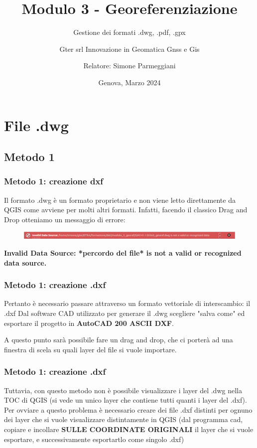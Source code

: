 \documentclass{beamer}
\title{Modulo 3 - Georeferenziazione}
\subtitle{Gestione dei formati .dwg, .pdf, .gpx}
\author[]{Gter srl Innovazione in Geomatica Gnss e Gis}
\author[]{Relatore: Simone Parmeggiani}
\date{Genova, Marzo 2024}
\begin{document}
	{
		{
			\begin{frame}
				\titlepage
			\end{frame}
		}
		\addtocounter{framenumber}{-1}

\section{File .dwg}
\subsection{Metodo 1}

\begin{frame}
   \frametitle{Metodo 1: creazione dxf}

   Il formato .dwg è un formato proprietario e non viene letto direttamente da QGIS come avviene per molti altri formati. Infatti, facendo il classico Drag and Drop otteniamo un messaggio di errore:

    \begin{figure}[h]
        \centering
        \includegraphics[width=1.2\textwidth]{pics/drag_n_drop.png}
    \end{figure}   

    \textbf{Invalid Data Source: *percordo del file* is not a valid or recognized data source.}
    
     
\end{frame}

\begin{frame}
   \frametitle{Metodo 1: creazione .dxf}

   Pertanto è necessario passare attraverso un formato vettoriale di interscambio: il .dxf
   Dal software CAD utilizzato per generare il .dwg scegliere "salva come" ed esportare il progetto in \textbf{AutoCAD 200 ASCII DXF}.

    A questo punto sarà possibile fare un drag and drop, che ci porterà ad una finestra di scela su quali layer del file si vuole importare.

\end{frame}

\begin{frame}
   \frametitle{Metodo 1: creazione .dxf}

     Tuttavia, con questo metodo non è possibile visualizzare i layer del .dwg nella TOC di QGIS (si vede un unico layer che contiene tutti quanti i layer del .dxf).
    Per ovviare a questo problema è necessario creare dei file .dxf distinti per ognuno dei layer che si vuole visualizzare distintamente in QGIS (dal programma cad, copiare e incollare \textbf{SULLE COORDINATE ORIGINALI} il layer che si vuole esportare, e successivamente esportartlo come singolo .dxf)
\end{frame}


}
\end{document}
